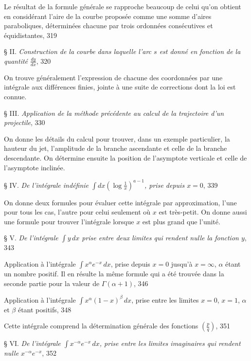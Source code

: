 \documentclass{article}
\begin{document}
Le résultat de la formule générale se rapproche beaucoup de celui qu'on obtient en considérant l'aire de la courbe proposée comme une somme d'aires paraboliques, déterminées chacune par trois ordonnées consécutives et équidistantes, 319

§ II. \emph{Construction de la courbe dans laquelle l'arc $s$ est donné en fonction de la quantité $\frac{dy}{dx}$}, 320

On trouve généralement l'expression de chacune des coordonnées par une intégrale aux différences finies, jointe à une suite de corrections dont la loi est connue.

§ III. \emph{Application de la méthode précédente au calcul de la trajectoire d'un projectile}, 330

On donne les détails du calcul pour trouver, dans un exemple particulier, la hauteur du jet, l'amplitude de la branche ascendante et celle de la branche descendante. On détermine ensuite la position de l'asymptote verticale et celle de l'asymptote inclinée.

§ IV. \emph{De l'intégrale indéfinie $\displaystyle\int dx\left(\log\frac{1}{x}\right)^{a-1}$, prise depuis $x=0$}, 339

On donne deux formules pour évaluer cette intégrale par approximation, l'une pour tous les cas, l'autre pour celui seulement où $x$ est très-petit. On donne aussi une formule pour trouver l'intégrale lorsque $x$ est plus grand que l'unité.

§ V. \emph{De l'intégrale $\displaystyle\int y\,dx$ prise entre deux limites qui rendent nulle la fonction $y$}, 343

Application à l'intégrale $\displaystyle\int x^{\alpha}e^{-x}\,dx$, prise depuis $x=0$ jusqu'à $x=\infty$, $\alpha$ étant un nombre positif. Il en résulte la même formule qui a été trouvée dans la seconde partie pour la valeur de $\Gamma(\alpha+1)$, 346

Application à l'intégrale $\displaystyle\int x^{\alpha}(1-x)^{\beta}\,dx$, prise entre les limites $x=0$, $x=1$, $\alpha$ et $\beta$ étant positifs, 348

Cette intégrale comprend la détermination générale des fonctions $\left(\frac{p}{q}\right)$, 351

§ VI. \emph{De l'intégrale $\displaystyle\int x^{-\alpha}e^{-x}\,dx$, prise entre les limites imaginaires qui rendent nulle $x^{-\alpha}e^{-x}$}, 352
\end{document}
